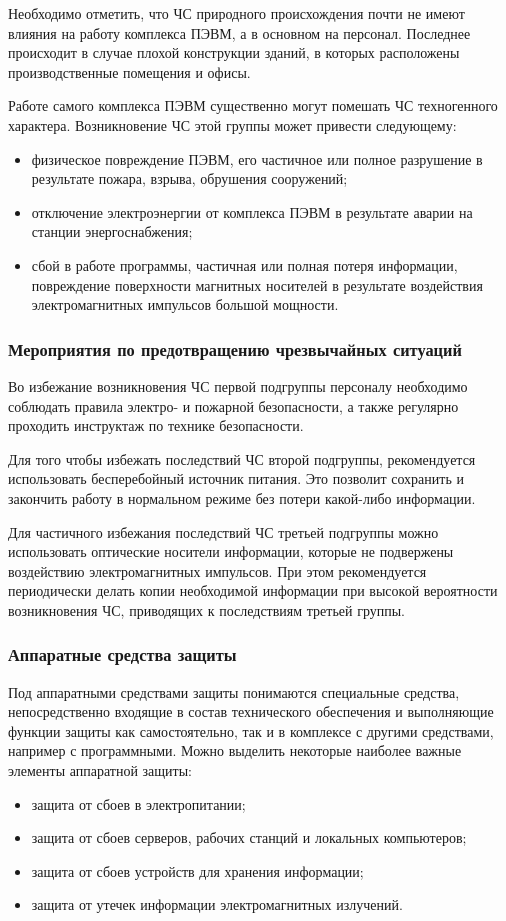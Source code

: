 Необходимо отметить, что ЧС природного происхождения почти не имеют влияния на работу комплекса ПЭВМ, а в основном на персонал.
Последнее происходит в случае плохой конструкции зданий, в которых расположены производственные помещения и офисы.

Работе самого комплекса ПЭВМ существенно могут помешать ЧС техногенного характера.
Возникновение ЧС этой группы может привести следующему:
\begin{itemize}
  \item физическое повреждение ПЭВМ, его частичное или полное разрушение в результате пожара, взрыва, обрушения сооружений;
  \item отключение электроэнергии от комплекса ПЭВМ в результате аварии на станции энергоснабжения;
  \item сбой в работе программы, частичная или полная потеря информации, повреждение поверхности магнитных носителей в результате воздействия электромагнитных импульсов большой мощности.
\end{itemize}

\subsubsection{Мероприятия по предотвращению чрезвычайных ситуаций}
Во избежание возникновения ЧС первой подгруппы персоналу необходимо соблюдать правила электро- и пожарной безопасности, а также регулярно проходить инструктаж по технике безопасности.

Для того чтобы избежать последствий ЧС второй подгруппы, рекомендуется использовать бесперебойный источник питания. Это позволит сохранить и закончить работу в нормальном режиме без потери какой-либо информации.

Для частичного избежания последствий ЧС третьей подгруппы можно использовать оптические носители информации, которые не подвержены воздействию электромагнитных импульсов.
При этом рекомендуется периодически делать копии необходимой информации при высокой вероятности возникновения ЧС, приводящих к последствиям третьей группы.

\subsubsection{Аппаратные средства защиты}

Под аппаратными средствами защиты понимаются специальные средства, непосредственно входящие в состав технического обеспечения и выполняющие функции защиты как самостоятельно, так и в комплексе с другими средствами, например с программными.
Можно выделить некоторые наиболее важные элементы аппаратной защиты:
\begin{itemize}
  \item защита от сбоев в электропитании;
  \item защита от сбоев серверов, рабочих станций и локальных компьютеров;
  \item защита от сбоев устройств для хранения информации;
  \item защита от утечек информации электромагнитных излучений.
\end{itemize}

